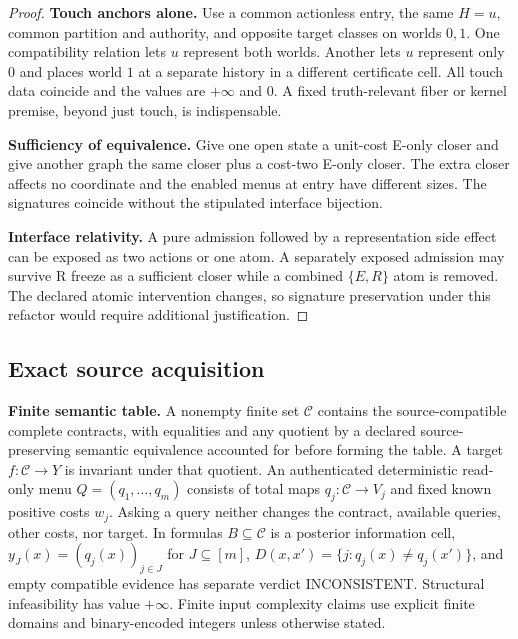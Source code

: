 \begin{proof}
\textbf{Touch anchors alone.} Use a common actionless entry, the same \(H=u\), common partition and authority, and opposite target classes on worlds \(0,1\). One compatibility relation lets \(u\) represent both worlds. Another lets \(u\) represent only \(0\) and places world \(1\) at a separate history in a different certificate cell. All touch data coincide and the values are \(+\infty\) and \(0\). A fixed truth-relevant fiber or kernel premise, beyond just touch, is indispensable.

\textbf{Sufficiency of equivalence.} Give one open state a unit-cost E-only closer and give another graph the same closer plus a cost-two E-only closer. The extra closer affects no coordinate and the enabled menus at entry have different sizes. The signatures coincide without the stipulated interface bijection.

\textbf{Interface relativity.} A pure admission followed by a representation side effect can be exposed as two actions or one atom. A separately exposed admission may survive R freeze as a sufficient closer while a combined \(\{E,R\}\) atom is removed. The declared atomic intervention changes, so signature preservation under this refactor would require additional justification.

\end{proof}

\subsection{Exact source acquisition}

\textbf{Finite semantic table.} A nonempty finite set \(\mathcal C\) contains the source-compatible complete contracts, with equalities and any quotient by a declared source-preserving semantic equivalence accounted for before forming the table. A target \(f:\mathcal C\to Y\) is invariant under that quotient. An authenticated deterministic read-only menu \(Q=(q_1,\ldots,q_m)\) consists of total maps \(q_j:\mathcal C\to V_j\) and fixed known positive costs \(w_j\). Asking a query neither changes the contract, available queries, other costs, nor target. In formulas \(B\subseteq\mathcal C\) is a posterior information cell, \(y_J(x)=(q_j(x))_{j\in J}\) for \(J\subseteq[m]\), \(D(x,x')=\{j:q_j(x)\ne q_j(x')\}\), and empty compatible evidence has separate verdict INCONSISTENT. Structural infeasibility has value \(+\infty\). Finite input complexity claims use explicit finite domains and binary-encoded integers unless otherwise stated.

